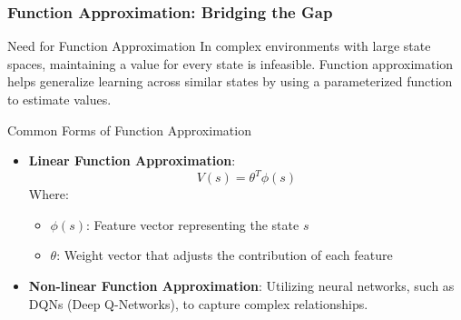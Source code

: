 \documentclass[aspectratio=169]{beamer}
\begin{document}
\begin{frame}[fragile]
    \frametitle{Function Approximation: Bridging the Gap}
    
    \begin{block}{Need for Function Approximation}
        In complex environments with large state spaces, maintaining a value for every state is infeasible. Function approximation helps generalize learning across similar states by using a parameterized function to estimate values.
    \end{block}
    
    \begin{block}{Common Forms of Function Approximation}
        \begin{itemize}
            \item \textbf{Linear Function Approximation}:
            \begin{equation}
                V(s) = \theta^T \phi(s)
            \end{equation}
            Where:
            \begin{itemize}
                \item $\phi(s)$: Feature vector representing the state $s$
                \item $\theta$: Weight vector that adjusts the contribution of each feature
            \end{itemize}
            
            \item \textbf{Non-linear Function Approximation}: Utilizing neural networks, such as DQNs (Deep Q-Networks), to capture complex relationships.
        \end{itemize}
    \end{block}
\end{frame}
\end{document}
